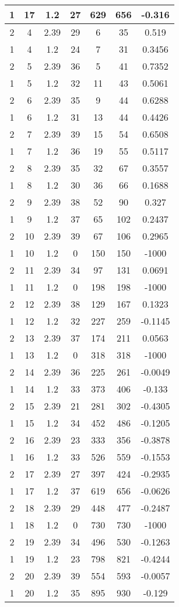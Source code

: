 \documentclass[letterpaper, 12pt]{article}
\begin{document}
\begin{longtable}{|c|c|c|c|c|c|c|}
\hline
1 & 17 & 1.2 & 27 & 629 & 656 & -0.316 \\
\hline
2 & 4 & 2.39 & 29 & 6 & 35 & 0.519 \\
\hline
1 & 4 & 1.2 & 24 & 7 & 31 & 0.3456 \\
\hline
2 & 5 & 2.39 & 36 & 5 & 41 & 0.7352 \\
\hline
1 & 5 & 1.2 & 32 & 11 & 43 & 0.5061 \\
\hline
2 & 6 & 2.39 & 35 & 9 & 44 & 0.6288 \\
\hline
1 & 6 & 1.2 & 31 & 13 & 44 & 0.4426 \\
\hline
2 & 7 & 2.39 & 39 & 15 & 54 & 0.6508 \\
\hline
1 & 7 & 1.2 & 36 & 19 & 55 & 0.5117 \\
\hline
2 & 8 & 2.39 & 35 & 32 & 67 & 0.3557 \\
\hline
1 & 8 & 1.2 & 30 & 36 & 66 & 0.1688 \\
\hline
2 & 9 & 2.39 & 38 & 52 & 90 & 0.327 \\
\hline
1 & 9 & 1.2 & 37 & 65 & 102 & 0.2437 \\
\hline
2 & 10 & 2.39 & 39 & 67 & 106 & 0.2965 \\
\hline
1 & 10 & 1.2 & 0 & 150 & 150 & -1000 \\
\hline
2 & 11 & 2.39 & 34 & 97 & 131 & 0.0691 \\
\hline
1 & 11 & 1.2 & 0 & 198 & 198 & -1000 \\
\hline
2 & 12 & 2.39 & 38 & 129 & 167 & 0.1323 \\
\hline
1 & 12 & 1.2 & 32 & 227 & 259 & -0.1145 \\
\hline
2 & 13 & 2.39 & 37 & 174 & 211 & 0.0563 \\
\hline
1 & 13 & 1.2 & 0 & 318 & 318 & -1000 \\
\hline
2 & 14 & 2.39 & 36 & 225 & 261 & -0.0049 \\
\hline
1 & 14 & 1.2 & 33 & 373 & 406 & -0.133 \\
\hline
2 & 15 & 2.39 & 21 & 281 & 302 & -0.4305 \\
\hline
1 & 15 & 1.2 & 34 & 452 & 486 & -0.1205 \\
\hline
2 & 16 & 2.39 & 23 & 333 & 356 & -0.3878 \\
\hline
1 & 16 & 1.2 & 33 & 526 & 559 & -0.1553 \\
\hline
2 & 17 & 2.39 & 27 & 397 & 424 & -0.2935 \\
\hline
1 & 17 & 1.2 & 37 & 619 & 656 & -0.0626 \\
\hline
2 & 18 & 2.39 & 29 & 448 & 477 & -0.2487 \\
\hline
1 & 18 & 1.2 & 0 & 730 & 730 & -1000 \\
\hline
2 & 19 & 2.39 & 34 & 496 & 530 & -0.1263 \\
\hline
1 & 19 & 1.2 & 23 & 798 & 821 & -0.4244 \\
\hline
2 & 20 & 2.39 & 39 & 554 & 593 & -0.0057 \\
\hline
1 & 20 & 1.2 & 35 & 895 & 930 & -0.129 \\
\hline
\end{longtable}
\end{document}
